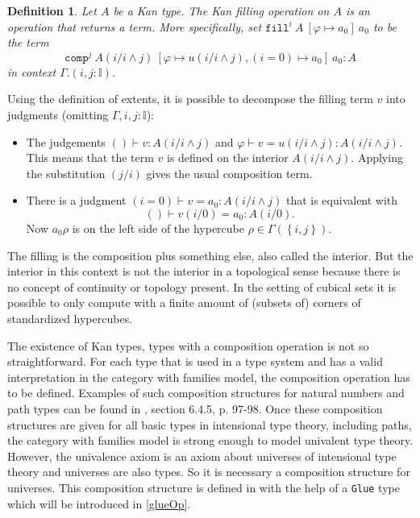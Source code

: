 \documentclass[12pt,a4paper,twoside,xetex]{book}
\newcommand{\keyword}[1]{\emph{#1}\index{#1}}
\newtheorem{definition}[theorem]{Definition}
\newcommand{\op}[1]{\mathtt{#1}}
\newcommand{\fillt}[5]{\op{fill}^{#1} \ {#2} \ \left[{#3} \mapsto {#5} \right] \ {#5}}
\begin{document}
\begin{definition}\label{filldef}
Let $A$ be a Kan type. The Kan \keyword{filling} operation on $A$ is an 
operation that returns a term. More specifically, set 
$\fillt{i}{A}{\varphi}{u}{a_0}$ to be the term $$\op{comp}^j \ A(i/i \wedge j) 
\ \left[\varphi \mapsto u(i/i \wedge j), (i=0) \mapsto a_0 \right] \ a_0 : A $$ 
in context $\Gamma . (i, j: \mathbb{I})$.
\end{definition}

Using the definition of extents, it is possible to decompose the filling term 
$v$ into judgments (omitting $\Gamma, i,j : \mathbb{I}$):

\begin{itemize}

\item The judgements $()\vdash v : A(i/i \wedge j)$ and $\varphi \vdash v = 
u(i/i \wedge j) : A(i/i \wedge j)$. 
This means that the term $v$ is defined on the interior $A(i/i \wedge j)$. 
Applying the substitution $(j/i)$ gives the usual composition term.

\item There is a judgment $(i = 0) \vdash v = a_0 : A(i/i \wedge j)$ that is 
equivalent with $$() \vdash v(i/0) = a_0 : A(i/0).$$
Now $a_0\rho$ is on the left side of the hypercube $\rho \in \Gamma \left( 
\left\{i,j\right\} \right)$.

\end{itemize}

The filling is the composition plus something else, also called the interior. 
But the interior in this context is not the interior in a topological sense 
because there is no concept of continuity or topology present. In the setting of cubical sets it is 
possible to only compute with a finite amount of (subsets of) corners of 
standardized hypercubes.

The existence of Kan types, types with a composition operation is not so 
straightforward. For each type that is used in a type system and has a valid 
interpretation in the category with families model, the composition operation 
has to be defined. Examples of such composition structures for natural numbers 
and path types can be found in \cite{Huber2016}, section 6.4.5, p. 97-98. Once 
these composition structures are given for all basic types in intensional type 
theory, including paths, the category with families model is strong enough to 
model univalent type theory. However, the univalence axiom is an axiom about 
universes of intensional type theory and universes are also types. So it is 
necessary a composition structure for universes. This composition structure is 
defined in \cite{Huber2016} with the help of a \texttt{Glue} type which will be 
introduced in \cref{glueOp}. 
\end{document}
